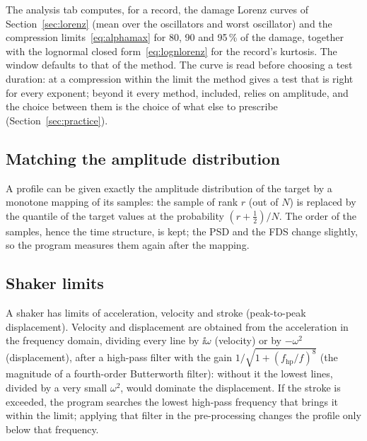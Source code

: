 The analysis tab computes, for a record, the damage Lorenz curves of Section~\ref{sec:lorenz} (mean
over the oscillators and worst oscillator) and the compression limits~\eqref{eq:alphamax} for 80, 90 and
95\,\% of the damage, together with the lognormal closed form~\eqref{eq:lognlorenz} for the record's
kurtosis. The window defaults to that of the  method. The curve is read before choosing a
test duration: at a compression within the limit the  method gives a test that is right for
every exponent; beyond it every method,  included, relies on amplitude, and the choice
between them is the choice of what else to prescribe (Section~\ref{sec:practice}).

\subsection{Matching the amplitude distribution}

A profile can be given exactly the amplitude distribution of the target by a monotone mapping of its
samples: the sample of rank $r$ (out of $N$) is replaced by the quantile of the target values at the
probability $(r+\tfrac12)/N$. The order of the samples, hence the time structure, is kept; the PSD and
the FDS change slightly, so the program measures them again after the mapping.

\subsection{Shaker limits}

A shaker has limits of acceleration, velocity and stroke (peak-to-peak displacement). Velocity and
displacement are obtained from the acceleration in the frequency domain, dividing every line by
$\ii\omega$ (velocity) or by $-\omega^2$ (displacement), after a high-pass filter with the gain
$1/\sqrt{1+(f_{\mathrm{hp}}/f)^8}$ (the magnitude of a fourth-order Butterworth filter): without it
the lowest lines, divided by a very small $\omega^2$, would dominate the displacement. If the stroke
is exceeded, the program searches the lowest high-pass frequency that brings it within the limit;
applying that filter in the pre-processing changes the profile only below that frequency.
